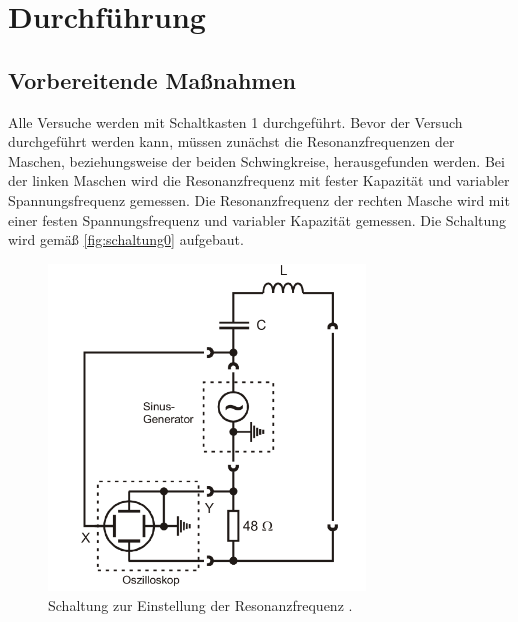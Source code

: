 \section{Durchführung}
\label{sec:Durchführung}

\subsection{Vorbereitende Maßnahmen}
Alle Versuche werden mit Schaltkasten 1 durchgeführt.
Bevor der Versuch durchgeführt werden kann, müssen zunächst die Resonanzfrequenzen der Maschen, beziehungsweise der beiden Schwingkreise,
herausgefunden werden.
Bei der linken Maschen wird die Resonanzfrequenz mit fester Kapazität und variabler Spannungsfrequenz %
gemessen. Die Resonanzfrequenz der rechten Masche wird mit einer festen Spannungsfrequenz und variabler Kapazität  gemessen.
Die Schaltung wird gemäß \autoref{fig:schaltung0} aufgebaut.
\begin{figure}[H]
    \centering
    \includegraphics[width=0.75\textwidth]{plots/Schaltung0.png}
    \caption{Schaltung zur Einstellung der Resonanzfrequenz \cite{v355}.}
    \label{fig:schaltung0}
\end{figure}

